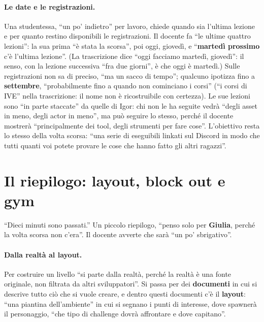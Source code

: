 \paragraph{Le date e le registrazioni.} Una studentessa, ``un po' indietro'' per lavoro,
chiede quando sia l'ultima lezione e per quanto restino disponibili le registrazioni. Il
docente fa ``le ultime quattro lezioni'': la sua prima ``è stata la scorsa'', poi oggi,
giovedì, e ``\textbf{martedì prossimo} c'è l'ultima lezione''. (La trascrizione dice ``oggi
facciamo martedì, giovedì'': il senso, con la lezione successiva ``fra due giorni'', è che
oggi è martedì.) Sulle registrazioni non sa di preciso, ``ma un sacco di tempo''; qualcuno
ipotizza fino a \textbf{settembre}, ``probabilmente fino a quando non cominciano i corsi''
(``i corsi di IVE'' nella trascrizione: il nome non è ricostruibile con certezza). Le sue
lezioni sono ``in parte staccate'' da quelle di Igor: chi non le ha seguite vedrà ``degli
asset in meno, degli actor in meno'', ma può seguire lo stesso, perché il docente mostrerà
``principalmente dei tool, degli strumenti per fare cose''. L'obiettivo resta lo stesso
della volta scorsa: ``una serie di eseguibili linkati sul Discord in modo che tutti quanti
voi potete provare le cose che hanno fatto gli altri ragazzi''.

\section{Il riepilogo: layout, block out e gym}
\label{ue14:sec:recap}

``Dieci minuti sono passati.'' Un piccolo riepilogo, ``penso solo per \textbf{Giulia}, perché
la volta scorsa non c'era''. Il docente avverte che sarà ``un po' sbrigativo''.

\paragraph{Dalla realtà al layout.} Per costruire un livello ``si parte dalla realtà,
perché la realtà è una fonte originale, non filtrata da altri sviluppatori''. Si passa per
dei \textbf{documenti} in cui si descrive tutto ciò che si vuole creare, e dentro questi
documenti c'è il \textbf{layout}: ``una piantina dell'ambiente'' in cui si segnano i punti
di interesse, dove spawnerà il personaggio, ``che tipo di challenge dovrà affrontare e dove
capitano''.

